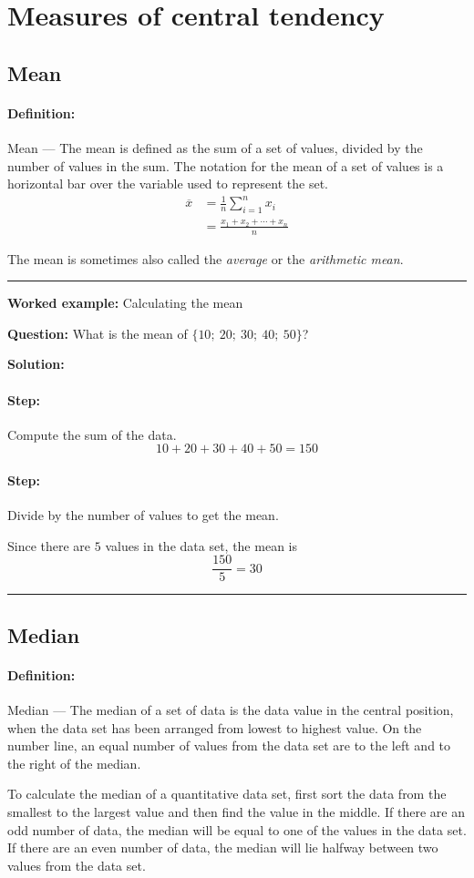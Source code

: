 \documentclass[a4paper,11pt]{report}
\def\Definition#1#2{\paragraph{Definition:} #1 --- #2}
\newenvironment{wex}[3]%
{\rule{\linewidth}{0.5mm}
\textbf{Worked example:} #1

\textbf{Question:} #2

\textbf{Solution:} #3}%
{\rule{\linewidth}{0.5mm}}
\newcommand{\westep}[1]{\paragraph{Step:} #1}
\begin{document}
\section{Measures of central tendency}

\subsection{Mean}
\Definition{Mean}{The mean is defined as the sum of a set of values,
  divided by the number of values in the sum.  The notation for the
  mean of a set of values is a horizontal bar over the variable used
  to represent the set.
  \begin{align}
    \overline{x} &= \frac{1}{n}\sum_{i=1}^n x_i \\
                 &= \frac{x_1 + x_2 + \cdots + x_n}{n}
  \end{align}
}

The mean is sometimes also called the {\em average} or the {\em
  arithmetic mean}.

\begin{wex}{Calculating the mean}{
    What is the mean of $\{10;\ 20;\ 30;\ 40;\ 50\}$?
}{
  \westep{Compute the sum of the data.}
  \begin{equation}
    10 + 20 + 30 + 40 + 50 = 150
  \end{equation}

  \westep{Divide by the number of values to get the mean.}

  Since there are $5$ values in the data set, the mean is
  \begin{equation}
    \frac{150}{5} = 30
  \end{equation}
}
\end{wex}

\subsection{Median}
\Definition{Median}{
  The median of a set of data is the data value in the central
  position, when the data set has been arranged from lowest to highest
  value. On the number line, an equal number of values from the data
  set are to the left and to the right of the median.}

To calculate the median of a quantitative data set, first sort the
data from the smallest to the largest value and then find the value in
the middle. If there are an odd number of data, the median will be
equal to one of the values in the data set. If there are an even
number of data, the median will lie halfway between two values from
the data set.
\end{document}
